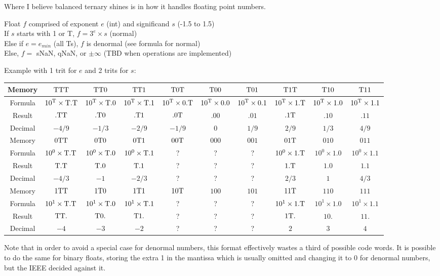 \documentclass{article}
\begin{document}
Where I believe balanced ternary shines is in how it handles floating point numbers.


Float $f$ comprised of exponent $e$ (int) and significand $s$ (-1.5 to 1.5) \\
If $s$ starts with 1 or T, $f = 3^e \times s$ (normal) \\
Else if $e=e_{min}$ (all Ts), $f$ is denormal (see formula for normal) \\
Else, $f =$ sNaN, qNaN, or $\pm\infty$ (TBD when operations are implemented)
\setlength{\tabcolsep}{5pt}
\renewcommand{\arraystretch}{1.25}

\noindent
Example with 1 trit for $e$ and 2 trits for $s$: \\
\hspace{-2cm}
\begin{tabular}{*{10}{|c}|}
  \hline
  Memory
  & $\mathrm{T}\mathrm{T}\mathrm{T}$ & $\mathrm{T}\mathrm{T}0$ & $\mathrm{T}\mathrm{T}1$
  & $\mathrm{T}0\mathrm{T}$ & $\mathrm{T}00$ & $\mathrm{T}01$
  & $\mathrm{T}1\mathrm{T}$ & $\mathrm{T}10$ & $\mathrm{T}11$ \\ \hline
  Formula
  & $10^{\mathrm{T}} \times \mathrm{T}.\mathrm{T}$ & $10^{\mathrm{T}} \times \mathrm{T}.0$ & $10^{\mathrm{T}} \times \mathrm{T}.1$
  & $10^{\mathrm{T}} \times 0.\mathrm{T}$ & $10^{\mathrm{T}} \times 0.0$ & $10^{\mathrm{T}} \times 0.1$
  & $10^{\mathrm{T}} \times 1.\mathrm{T}$ & $10^{\mathrm{T}} \times 1.0$ & $10^{\mathrm{T}} \times 1.1$ \\ \hline
  Result
  & $.\mathrm{T}\mathrm{T}$ & $.\mathrm{T}0$ & $.\mathrm{T}1$
  & $.0\mathrm{T}$ & $.00$ & $.01$
  & $.1\mathrm{T}$ & $.10$ & $.11$ \\ \hline
  Decimal
  & $-4/9$ & $-1/3$ & $-2/9$
  & $-1/9$ & $0$ & $1/9$
  & $2/9$ & $1/3$ & $4/9$ \\ \hline
  \hline
  Memory
  & $0\mathrm{T}\mathrm{T}$ & $0\mathrm{T}0$ & $0\mathrm{T}1$
  & $00\mathrm{T}$ & $000$ & $001$
  & $01\mathrm{T}$ & $010$ & $011$ \\ \hline
  Formula
  & $10^0 \times \mathrm{T}.\mathrm{T}$ & $10^0 \times \mathrm{T}.0$ & $10^0 \times \mathrm{T}.1$
  & ? & ? & ?
  & $10^0 \times 1.\mathrm{T}$ & $10^0 \times 1.0$ & $10^0 \times 1.1$ \\ \hline
  Result
  & $\mathrm{T}.\mathrm{T}$ & $\mathrm{T}.0$ & $\mathrm{T}.1$
  & ? & ? & ?
  & $1.\mathrm{T}$ & $1.0$ & $1.1$ \\ \hline
  Decimal
  & $-4/3$ & $-1$ & $-2/3$
  & ? & ? & ?
  & $2/3$ & $1$ & $4/3$ \\ \hline
  \hline
  Memory
  & $1\mathrm{T}\mathrm{T}$ & $1\mathrm{T}0$ & $1\mathrm{T}1$
  & $10\mathrm{T}$ & $100$ & $101$
  & $11\mathrm{T}$ & $110$ & $111$ \\ \hline
  Formula
  & $10^1 \times \mathrm{T}.\mathrm{T}$ & $10^1 \times \mathrm{T}.0$ & $10^1 \times \mathrm{T}.1$
  & ? & ? & ?
  & $10^1 \times 1.\mathrm{T}$ & $10^1 \times 1.0$ & $10^1 \times 1.1$ \\ \hline
  Result
  & $\mathrm{T}\mathrm{T}.$ & $\mathrm{T}0.$ & $\mathrm{T}1.$
  & ? & ? & ?
  & $1\mathrm{T}.$ & $10.$ & $11.$ \\ \hline
  Decimal
  & $-4$ & $-3$ & $-2$
  & ? & ? & ?
  & $2$ & $3$ & $4$ \\ \hline
\end{tabular}

Note that in order to avoid a special case for denormal numbers,
this format effectively wastes a third of possible code words.
It is possible to do the same for binary floats,
storing the extra 1 in the mantissa which is usually omitted
and changing it to 0 for denormal numbers,
but the IEEE decided against it.
\end{document}
